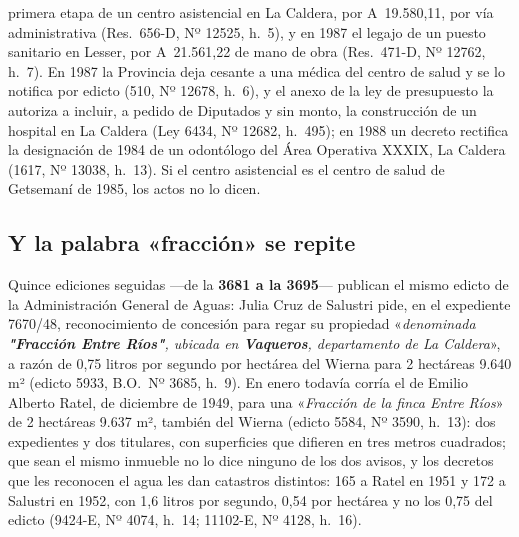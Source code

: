 \begin{cautela}
primera etapa de un centro asistencial en La Caldera, por A~19.580,11, por vía administrativa (Res.\ 656-D, Nº 12525, h.\ 5), y en 1987 el legajo de un puesto sanitario en Lesser, por A~21.561,22 de mano de obra (Res.\ 471-D, Nº 12762, h.\ 7). En 1987 la Provincia deja cesante a una médica del centro de salud y se lo notifica por edicto (510, Nº 12678, h.\ 6), y el anexo de la ley de presupuesto la autoriza a incluir, a pedido de Diputados y sin monto, la construcción de un hospital en La Caldera (Ley 6434, Nº 12682, h.\ 495); en 1988 un decreto rectifica la designación de 1984 de un odontólogo del Área Operativa XXXIX, La Caldera (1617, Nº 13038, h.\ 13). Si el centro asistencial es el centro de salud de Getsemaní de 1985, los actos no lo dicen.
\end{cautela}

\subsection*{Y la palabra «fracción» se repite}

Quince ediciones seguidas ---de la \textbf{3681 a la 3695}--- publican el mismo edicto de la
Administración General de Aguas: Julia Cruz de Salustri pide, en el expediente 7670/48,
reconocimiento de concesión para regar su propiedad «\textit{denominada \textbf{"Fracción Entre
Ríos"}, ubicada en \textbf{Vaqueros}, departamento de La Caldera}», a razón de 0,75 litros por
segundo por hectárea del Wierna para 2 hectáreas 9.640 m² (edicto 5933, B.O.\ Nº 3685, h.\ 9). En
enero todavía corría el de Emilio Alberto Ratel, de diciembre de 1949, para una «\textit{Fracción de
la finca Entre Ríos}» de 2 hectáreas 9.637 m², también del Wierna (edicto 5584, Nº 3590, h.\ 13):
dos expedientes y dos titulares, con superficies que difieren en tres metros cuadrados; que sean el
mismo inmueble no lo dice ninguno de los dos avisos, y los decretos que les reconocen el agua les dan catastros distintos: 165 a Ratel en 1951 y 172 a Salustri en 1952, con 1,6 litros por segundo, 0,54 por hectárea y no los 0,75 del edicto (9424-E, Nº 4074, h.\ 14; 11102-E, Nº 4128, h.\ 16).

